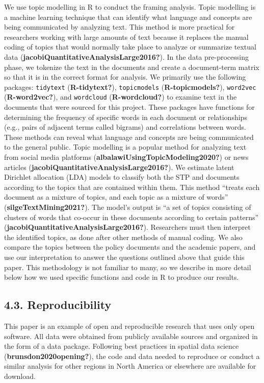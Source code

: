 \documentclass[]{elsarticle} %
\begin{document}
We use topic modelling in R to conduct the framing analysis. Topic
modelling is a machine learning technique that can identify what
language and concepts are being communicated by analyzing text. This
method is more practical for researchers working with large amounts of
text because it replaces the manual coding of topics that would normally
take place to analyze or summarize textual data
(\textbf{jacobiQuantitativeAnalysisLarge2016?}). In the data
pre-processing phase, we tokenize the text in the documents and create a
document-term matrix so that it is in the correct format for analysis.
We primarily use the following packages: \texttt{tidytext}
(\textbf{R-tidytext?}), \texttt{topicmodels} (\textbf{R-topicmodels?}),
\texttt{word2vec} (\textbf{R-word2vec?}), and \texttt{wordcloud}
(\textbf{R-wordcloud?}) to examine text in the documents that were
sourced for this project. These packages have functions for determining
the frequency of specific words in each document or relationships (e.g.,
pairs of adjacent terms called bigrams) and correlations between words.
These methods can reveal what language and concepts are being
communicated to the general public. Topic modelling is a popular method
for analyzing text from social media platforms
(\textbf{albalawiUsingTopicModeling2020?}) or news articles
(\textbf{jacobiQuantitativeAnalysisLarge2016?}). We estimate latent
Dirichlet allocation (LDA) models to classify both the STP and documents
according to the topics that are contained within them. This method
``treats each document as a mixture of topics, and each topic as a
mixture of words'' (\textbf{silgeTextMining2021?}). The model's output
is ``a set of topics consisting of clusters of words that co-occur in
these documents according to certain patterns''
(\textbf{jacobiQuantitativeAnalysisLarge2016?}). Researchers must then
interpret the identified topics, as done after other methods of manual
coding. We also compare the topics between the policy documents and the
academic papers, and use our interpretation to answer the questions
outlined above that guide this paper. This methodology is not familiar
to many, so we describe in more detail below how we used specific
functions and code in R to produce our results.

\hypertarget{reproducibility}{%
\subsection{4.3. Reproducibility}\label{reproducibility}}

This paper is an example of open and reproducible research that uses
only open software. All data were obtained from publicly available
sources and organized in the form of a data package. Following best
practices in spatial data science (\textbf{brunsdon2020opening?}), the
code and data needed to reproduce or conduct a similar analysis for
other regions in North America or elsewhere are available for download.
\end{document}
